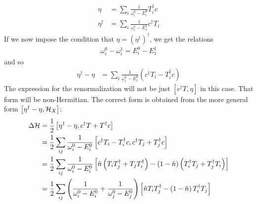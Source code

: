 \documentclass[12pt,twoside]{article}
\numberwithin{equation}{section}
\begin{document}
\begin{equation}\begin{aligned}
	\eta &= \sum_i \frac{1}{\omega^0_i - E^0_i} T_i^\dagger c\\
	\eta^\dagger &= \sum_i \frac{1}{\omega^1_i - E^1_1}c^\dagger T_i
\end{aligned}\end{equation}
If we now impose the condition that \(\eta =  \left( \eta^\dagger \right) ^\dagger\), we get the relations
\begin{equation}\begin{aligned}
	\omega^0_i - \omega^1_i = E^0_i - E^1_1
\end{aligned}\end{equation}
and so
\begin{equation}\begin{aligned}
	\eta^\dagger - \eta &= \sum_i \frac{1}{\omega^0_i - E^0_i}\left(c^\dagger T_i - T_i^\dagger c\right)
\end{aligned}\end{equation}
The expression for the renormalization will not be just \(\left[c^\dagger T, \eta \right]\) in this case. That form will be non-Hermitian. The correct form is obtained from the more general form \(\left[\eta^\dagger - \eta, \mathcal{H}_X \right]\):
\begin{equation}\begin{aligned}
	\Delta \mathcal{H} &= \frac{1}{2}\left[\eta^\dagger - \eta, c^\dagger T + T^\dagger c\right]\\
		    &= \frac{1}{2}\sum_{ij} \frac{1}{\omega^0_i - E^0_i}\left[c^\dagger T_i - T_i^\dagger c, c^\dagger T_j + T_j^\dagger c\right]\\
		    &= \frac{1}{2}\sum_{ij} \frac{1}{\omega^0_i - E^0_i}\left[\hat n \left(T_i T_j^\dagger + T_j T_i^\dagger \right) - \left(1 - \hat n\right)\left(T_i^\dagger T_j + T_j^\dagger T_i\right)\right]\\
		    &= \frac{1}{2}\sum_{ij} \left(\frac{1}{\omega^0_i - E^0_i} + \frac{1}{\omega^0_j - E^0_j}\right)\left[\hat n T_i T_j^\dagger - \left(1 - \hat n\right)T_i^\dagger T_j\right]\\ 
\end{aligned}\end{equation}
\end{document}
